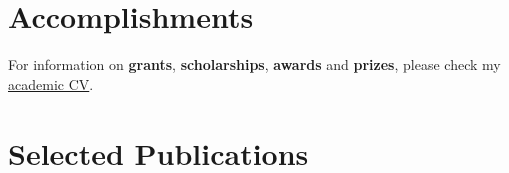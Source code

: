 \documentclass[11pt,a4paper,]{awesome-cv}
\begin{document}
\begin{cventries}
    \vspace{-4.0mm}
    \vspace{-4.0mm}
\end{cventries}

\hypertarget{accomplishments-1}{%
\section{Accomplishments}\label{accomplishments-1}}

For information on \textbf{grants}, \textbf{scholarships},
\textbf{awards} and \textbf{prizes}, please check my
\href{https://jdleongomez.github.io/Mile_CV/CV_eng/MVA_CV_en.pdf}{academic
CV}.

\hypertarget{selected-publications-1}{%
\section{Selected Publications}\label{selected-publications-1}}
\end{document}
